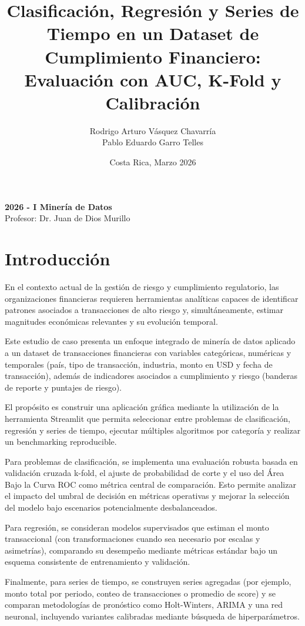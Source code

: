 \documentclass[12pt]{article}
\title{Clasificación, Regresión y Series de Tiempo en un Dataset de Cumplimiento Financiero:\\
Evaluación con AUC, K-Fold y Calibración}
\author{
Rodrigo Arturo Vásquez Chavarría \\
Pablo Eduardo Garro Telles
}
\date{Costa Rica, Marzo 2026}
\begin{document}
\maketitle

\begin{center}
\textbf{2026 - I Minería de Datos} \\
Profesor: Dr. Juan de Dios Murillo
\end{center}

\section{Introducción}

En el contexto actual de la gestión de riesgo y cumplimiento regulatorio, las organizaciones financieras requieren herramientas analíticas capaces de identificar patrones asociados a transacciones de alto riesgo y, simultáneamente, estimar magnitudes económicas relevantes y su evolución temporal.

Este estudio de caso presenta un enfoque integrado de minería de datos aplicado a un dataset de transacciones financieras con variables categóricas, numéricas y temporales (país, tipo de transacción, industria, monto en USD y fecha de transacción), además de indicadores asociados a cumplimiento y riesgo (banderas de reporte y puntajes de riesgo).

El propósito es construir una aplicación gráfica mediante la utilización de la herramienta Streamlit que permita seleccionar entre problemas de clasificación, regresión y series de tiempo, ejecutar múltiples algoritmos por categoría y realizar un benchmarking reproducible.

Para problemas de clasificación, se implementa una evaluación robusta basada en validación cruzada k-fold, el ajuste de probabilidad de corte y el uso del Área Bajo la Curva ROC como métrica central de comparación. Esto permite analizar el impacto del umbral de decisión en métricas operativas y mejorar la selección del modelo bajo escenarios potencialmente desbalanceados.

Para regresión, se consideran modelos supervisados que estiman el monto transaccional (con transformaciones cuando sea necesario por escalas y asimetrías), comparando su desempeño mediante métricas estándar bajo un esquema consistente de entrenamiento y validación.

Finalmente, para series de tiempo, se construyen series agregadas (por ejemplo, monto total por periodo, conteo de transacciones o promedio de score) y se comparan metodologías de pronóstico como Holt-Winters, ARIMA y una red neuronal, incluyendo variantes calibradas mediante búsqueda de hiperparámetros.
\end{document}

